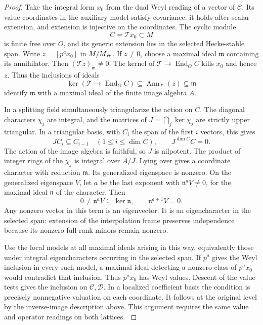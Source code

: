 \begin{proof}
Take the integral form \(x_0\) from the dual Weyl reading of a
vector of \(\mathcal C\). Its value coordinates in the auxiliary
model satisfy covariance: it holds after scalar extension, and
extension is injective on the coordinates. The cyclic module
\[
 C=\mathcal T x_0\subset M
\]
is finite free over \(O\), and its
generic extension lies in the selected Hecke-stable span.
Write \(z=[p^a x_0]\) in \(M/M_{\rm W}\). If \(z\ne0\),
choose a maximal ideal \(\mathfrak m\) containing its annihilator.
Then \((\mathcal T z)_{\mathfrak m}\ne0\).
The kernel of \(\mathcal T\to\operatorname{End}_O C\)
kills \(x_0\) and hence \(z\). Thus the inclusions of ideals
\[
     \ker(\mathcal T\to\operatorname{End}_O C)
                   \subseteq\operatorname{Ann}_{\mathcal T}(z)
                   \subseteq\mathfrak m
\]
identify \(\mathfrak m\) with a maximal ideal of the
finite image algebra \(A\).

In a splitting field simultaneously triangularize the action on
\(C\). The diagonal characters \(\chi_j\) are integral,
and the matrices of \(J=\bigcap_j\ker\chi_j\) are strictly upper
triangular. In a triangular basis, with \(C_i\) the span of the first
\(i\) vectors, this gives
\[
 JC_i\subseteq C_{i-1}\quad(1\le i\le\dim C),
 \qquad J^{\dim C}C=0 .
\]
The action of the image algebra is faithful, so \(J\) is nilpotent. The product of integer rings
of the \(\chi_j\) is integral over \(A/J\). Lying over
gives a coordinate character with reduction \(\mathfrak m\).
Its generalized eigenspace is nonzero. On the generalized eigenspace \(V\), let \(a\) be the last exponent with \(\mathfrak n^aV\ne0\), for the maximal ideal \(\mathfrak n\) of the character. Then
\[
 0\ne\mathfrak n^aV\subseteq\ker\mathfrak n,\qquad \mathfrak n^{a+1}V=0.
\]
Any nonzero vector in this term is an eigenvector. It is an eigencharacter in the selected span:
extension of the interpolation frame preserves independence
because its nonzero full-rank minors remain nonzero.

Use the local models at all maximal ideals arising in this
way, equivalently those under integral eigencharacters occurring
in the selected span. If \(p^a\) gives the Weyl inclusion in
every such model, a maximal ideal detecting a nonzero class of
\(p^a x_0\) would contradict that inclusion. Thus \(p^a x_0\) has
Weyl values. Descent of the value tests gives the inclusion on
\(\mathcal C,\mathcal D\). In a localized coefficient basis the
condition is precisely nonnegative valuation on each coordinate.
It follows at the original level by the inverse-image description
above. This argument requires the same value and operator readings on both lattices.
\label{cor:lift-exponent-models-2}

\end{proof}

